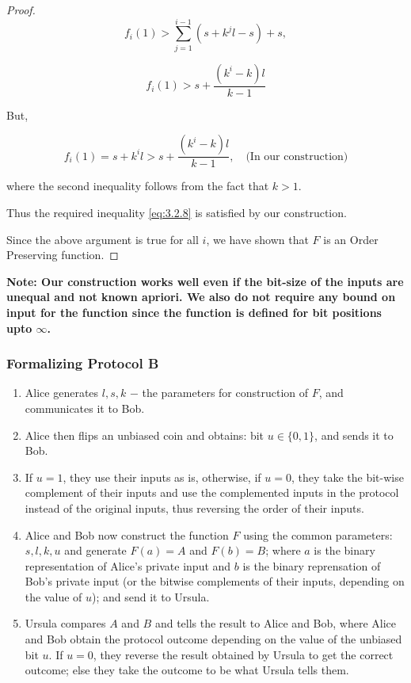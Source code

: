 \documentclass[11pt, letterpaper, romanappendices, onecolumn]{article}
\theoremstyle{plain}\newtheorem{thm}{Theorem}[section]
\theoremstyle{definition}
\theoremstyle{remark}
\begin{document}
\begin{proof}
\[
	f_i(1) > \sum\limits^{i-1}_{j=1}(s+k^j l- s) + s,
\]


\begin{equation}
	f_i(1) > s+\frac{(k^i-k)l}{k-1} \label{eq:3.2.8}
\end{equation}

\par But,

\[
	f_i(1) = s+k^i l > s+\frac{(k^i-k)l}{k-1}, \quad\text{(In our construction)}
\]
\par \quad where the second inequality follows from the fact that $k>1$.

\par Thus the required inequality \eqref{eq:3.2.8} is satisfied by our construction.

\par Since the above argument is true for all $i$, we have shown that $F$ is an Order Preserving function.
\end{proof}

\par\textbf{ Note: Our construction works well even if the bit-size of the inputs are unequal and not known apriori. We also do not require any bound on input for the function since the function is defined for bit positions upto $\infty$.}

\subsubsection{Formalizing Protocol \textsf{B}} \label{protb}
\begin{enumerate}
	\item Alice generates $l, s, k$ $-$ the parameters for construction of $F$, and communicates it to Bob.
	\item Alice then flips an unbiased coin and obtains: bit $u \in \lbrace 0,1\rbrace$, and sends it to Bob.
	\item If $u=1$, they use their inputs as is, otherwise, if $u=0$, they take the bit-wise complement of their inputs and use the complemented inputs in the protocol instead of the original inputs, thus reversing the order of their inputs.
	\item Alice and Bob now construct the function $F$ using the common parameters: $s,l,k,u$ and generate $F(a)=A$ and $F(b)=B$; where $a$ is the binary representation of Alice's private input and $b$ is the binary reprensation of Bob's private input (or the bitwise complements of their inputs, depending on the value of $u$); and send it to Ursula.
	\item Ursula compares $A$ and $B$ and tells the result to Alice and Bob, where Alice and Bob obtain the protocol outcome depending on the value of the unbiased bit $u$. If $u=0$, they reverse the result obtained by Ursula to get the correct outcome; else they take the outcome to be what Ursula tells them.
\end{enumerate}
\end{document}

